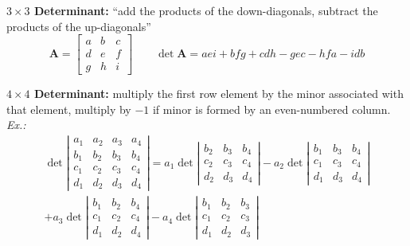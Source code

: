 \documentclass[10pt,landscape]{article}
\begin{document}
\begin{multicols}{3}
\par \textbf{$3 \times 3$ Determinant:} ``add the products of the down-diagonals, subtract the products of the up-diagonals''
\[ \mathbf{A} = \left[\begin{array}{ccc} a & b & c \\ d & e & f \\
g & h & i \end{array}\right] \qquad
\det \mathbf{A} = aei + bfg + cdh - gec - hfa - idb \]

\par \textbf{$4 \times 4$ Determinant:} multiply the first row element by the minor associated with that element, multiply by $-1$ if minor is formed by an even-numbered column. \textit{Ex.:}
{\tiny 
\begin{gather*} \det \left| \begin{array}{cccc} a_1 & a_2 & a_3 & a_4 \\
b_1 & b_2 & b_3 & b_4 \\
c_1 & c_2 & c_3 & c_4 \\
d_1 & d_2 & d_3 & d_4 \end{array} \right|  = a_1 \det\left| \begin{array}{ccc} b_2 & b_3 & b_4 \\ c_2 & c_3 & c_4 \\ d_2 & d_3 & d_4 \end{array} \right|
- a_2 \det\left| \begin{array}{ccc} b_1 & b_3 & b_4 \\ c_1 & c_3 & c_4 \\ d_1 & d_3 & d_4 \end{array} \right| \\ + a_3 \det\left| \begin{array}{ccc} b_1 & b_2 & b_4 \\ c_1 & c_2 & c_4 \\ d_1 & d_2 & d_4 \end{array} \right| - a_4 \det \left| \begin{array}{ccc} b_1 & b_2 & b_3  \\ c_1 & c_2 & c_3 \\ d_1 & d_2 & d_3 \end{array} \right| \end{gather*}
}


\end{multicols}
\end{document}
